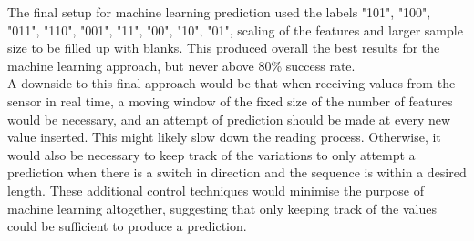 The final setup for machine learning prediction used the labels "101", "100", "011", "110", "001", "11", "00", "10", "01", scaling of the features and larger sample size to be filled up with blanks.
This produced overall the best results for the machine learning approach, but never above 80\% success rate.\\
A downside to this final approach would be that when receiving values from the sensor in real time, a moving window  of the fixed size of the number of features would be necessary, and an attempt of prediction should be made at every new value inserted.
This might likely slow down the reading process.
Otherwise, it would also be necessary to keep track of the variations to only attempt a prediction when there is a switch in direction and the sequence is within a desired length.
These additional control techniques would minimise the purpose of machine learning altogether, suggesting that only keeping track of the values could be sufficient to produce a prediction.

